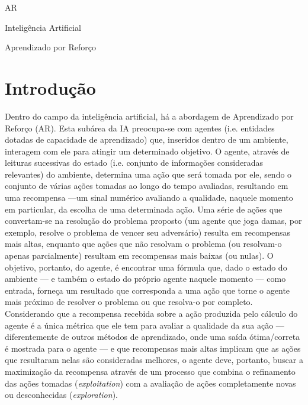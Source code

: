 \documentclass[cic,tc]{iiufrgs}
\begin{document}
    \begin{listofabbrv}{AR}
        \item[IA] Inteligência Artificial
        \item[AR] Aprendizado por Reforço
    \end{listofabbrv}
    
    
    \tableofcontents
    
    \chapter{Introdução}
     Dentro do campo da inteligência artificial, há a abordagem de Aprendizado por Reforço (AR). Esta subárea da IA preocupa-se com
     agentes (i.e.  entidades dotadas de capacidade de aprendizado) que, inseridos dentro de um ambiente, interagem com ele para atingir um determinado objetivo.
    O agente, através de leituras sucessivas do estado (i.e. conjunto de informações consideradas relevantes) do ambiente, determina uma ação que será tomada por ele,
     sendo o conjunto de várias ações tomadas ao longo do tempo avaliadas, resultando em uma recompensa ---um sinal numérico avaliando a qualidade, naquele momento
     em particular, da escolha de uma determinada ação. Uma série de ações que convertam-se na resolução do problema proposto (um agente que joga damas, por exemplo,
     resolve o problema de vencer seu adversário) resulta
     em recompensas mais altas, enquanto que ações que não resolvam o problema (ou resolvam-o apenas parcialmente) resultam em
     recompensas mais baixas (ou nulas). O objetivo, portanto, do agente, é encontrar uma fórmula que, dado o estado do ambiente
     --- e também o estado do próprio agente naquele momento --- como entrada, forneça um resultado que corresponda a uma ação que torne
     o agente mais próximo de resolver o problema ou que resolva-o por completo. Considerando que a recompensa recebida sobre a ação produzida pelo
     cálculo do agente é a única métrica que ele tem para avaliar a qualidade da sua ação --- diferentemente de outros
     métodos de aprendizado, onde uma saída ótima/correta é mostrada para o agente --- e que recompensas mais altas implicam
     que as ações que resultaram nelas são consideradas melhores, o agente deve, portanto, buscar a maximização da recompensa através
     de um processo que combina o refinamento das ações tomadas (\textit{exploitation}) com a avaliação de ações completamente novas ou
     desconhecidas (\textit{exploration}).
    
\end{document}
